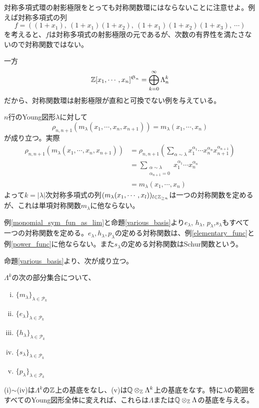 \documentclass{ltjsreport}
\begin{document}
\begin{notice}
  対称多項式環の射影極限をとっても対称関数環にはならないことに注意せよ。例えば対称多項式の列
  \[
    f=((1+x_1),\:(1+x_1)(1+x_2),\:(1+x_1)(1+x_2)(1+x_3),\:\cdots)
  \]
  を考えると、$f$は対称多項式の射影極限の元であるが、次数の有界性を満たさないので対称関数ではない。

  一方
  \[
  \mathbb{Z}[x_1,\cdots,x_n]^{\mathfrak{S}_n}=\bigoplus_{k=0}^\infty \Lambda^k_n  
  \]
  だから、対称関数環は射影極限が直和と可換でない例を与えている。
\end{notice}


\begin{eg}\label{monomial_sym_fun_as_lim}
  $n$行のYoung図形$\lambda$に対して
  \[
  \rho_{n,n+1}(m_\lambda(x_1,\cdots,x_n,x_{n+1}))=m_\lambda(x_1,\cdots,x_n)  
  \]
  が成り立つ。実際
  \begin{align*}
    \rho_{n,n+1}(m_\lambda(x_1,\cdots,x_n,x_{n+1}))
    &=\rho_{n,n+1}\left(
      \sum_{\alpha\sim\lambda}x_1^{\alpha_1}\cdots x_n^{\alpha_n}x_{n+1}^{\alpha_{n+1}}
      \right)\\
    &=\sum_{\substack{\alpha\sim\lambda \\ \alpha_{n+1}=0}}x_1^{\alpha_1}\cdots x_n^{\alpha_n}\\
    &=m_\lambda(x_1,\cdots,x_n)
  \end{align*}
  よって$k=|\lambda|$次対称多項式の列$(m_\lambda(x_1,\cdots,x_l))_{l\in\mathbb{Z}_{\geq n}}$は一つの対称関数を定めるが、これは単項対称関数$m_\lambda$に他ならない。
\end{eg}

\begin{eg}
  例\ref{monomial_sym_fun_as_lim}と命題\ref{various_basis}より$e_\lambda$, $h_\lambda$, $p_\lambda$,$s_\lambda$もすべて一つの対称関数を定める。$e_\lambda,h_\lambda,p_\lambda$の定める対称関数は、例\ref{elementary_func}と例\ref{power_func}に他ならない。また$s_\lambda$の定める対称関数はSchur関数という。
\end{eg}

命題\ref{various_basis}より、次が成り立つ。

\begin{prop}\label{various_symfunc_basis}
  $\Lambda^k$の次の部分集合について、
  \begin{enumerate}[(i)]
    \item $\{m_\lambda\}_{\lambda\in\mathcal{P}_k}$
    \item $\{e_\lambda\}_{\lambda\in\mathcal{P}_k}$
    \item $\{h_\lambda\}_{\lambda\in\mathcal{P}_k}$
    \item $\{s_\lambda\}_{\lambda\in\mathcal{P}_k}$
    \item $\{p_\lambda\}_{\lambda\in\mathcal{P}_k}$
  \end{enumerate}
  (i)$\sim$(iv)は$\Lambda^k$の$\mathbb{Z}$上の基底をなし、(v)は$\mathbb{Q}\otimes_{\mathbb{Z}}{\Lambda^k}$上の基底をなす。特に$\lambda$の範囲をすべてのYoung図形全体に変えれば、これらは$\Lambda$または$\mathbb{Q}\otimes_{\mathbb{Z}}{\Lambda}$の基底を与える。
\end{prop}
\end{document}
